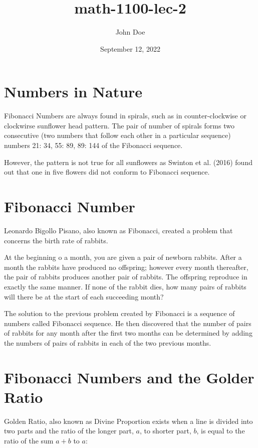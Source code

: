 \documentclass[12pt, UTF8]{article}
\title{math-1100-lec-2}
\author{John Doe}
\date{September 12, 2022}
\begin{document}
	\maketitle

	\section*{Numbers in Nature}

	Fibonacci Numbers are always found in spirals, such as in counter-clockwise or clockwirse sunflower head pattern. The pair of number of spirals forms two consecutive (two numbers that follow each other in a particular sequence) numbers {21: 34, 55: 89, 89: 144} of the Fibonacci sequence.

	However, the pattern is not true for all sunflowers as Swinton et al. (2016) found out that one in five flowers did not conform to Fibonacci sequence.

	\section{Fibonacci Number}

	Leonardo Bigollo Pisano, also known as Fibonacci, created a problem that concerns the birth rate of rabbits.

	\begin{displayquote}
		At the beginning o a month, you are given a pair of newborn rabbits. After a month the rabbits have produced no offspring; however every month thereafter, the pair of rabbits produces another pair of rabbits. The offspring reproduce in exactly the same manner. If none of the rabbit dies, how many pairs of rabbits will there be at the start of each succeeding month?
	\end{displayquote}

	The solution to the previous problem created by Fibonacci is a sequence of numbers called Fibonacci sequence. He then discovered that the number of pairs of rabbits for any month after the first two months can be determined by adding the numbers of pairs of rabbits in each of the two previous months.

	\section{Fibonacci Numbers and the Golder Ratio}

	Golden Ratio, also known as Divine Proportion exists when a line is divided into two parts and the ratio of the longer part, $a$, to shorter part, $b$, is equal to the ratio of the sum $a+b$ to $a$:
\end{document}
